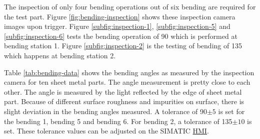 The inspection of only four bending operations out of six bending are required for the test part. Figure \ref{fig:bending-inspection} shows these inspection camera images upon trigger. Figure \ref{subfig:inspection-1}, \ref{subfig:inspection-5} and \ref{subfig:inspection-6} tests the bending operation of 90\textdegree{} which is performed at bending station 1. Figure \ref{subfig:inspection-2} is the testing of bending of 135\textdegree{} which happens at bending station 2.

Table \ref{tab:bending-data} shows the bending angles as measured by the inspection camera for ten sheet metal parts. The angle measurement is pretty close to each other. The angle is measured by the light reflected by the edge of sheet metal part. Because of different surface roughness and impurities on surface, there is slight deviation in the bending angles measured. A tolerance of 90$\pm5$\textdegree{} is set for the bending 1, bending 5 and bending 6. For bending 2, a tolerance of 135$\pm10$\textdegree{} is set. These tolerance values can be adjusted on the SIMATIC \hyperref[acro:HMI]{HMI}.

